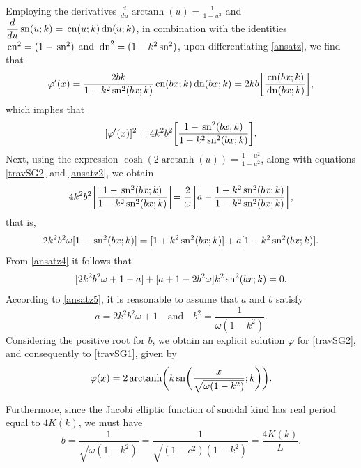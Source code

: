 \documentclass[12pt,reqno,a4paper]{amsart} %
\newcommand{\cn}{{\rm \,cn}}
\newcommand{\sn}{{\rm \,sn}}
\newcommand{\dn}{{\rm \,dn}}
\numberwithin{equation}{section}
\numberwithin{figure}{section}
\begin{document}
 Employing the derivatives $\displaystyle\frac{d}{du}\operatorname{arctanh}(u)=\frac{1}{1-u^2}$ and $\displaystyle\frac{d}{du}\sn(u;k)=\cn(u;k)\dn(u;k)$, in combination with the identities $ \cn^2=(1-\sn^2)$ and $\dn^2=(1-k^2\sn^2)$, upon differentiating \eqref{ansatz}, we find that
 \begin{equation}\label{varphilinha}
 	\varphi'(x) =\frac{2bk}{1-k^2 \sn^2 (bx ;k )} \cn (bx ;k ) \dn (bx ;k )= 2kb\biggl[ \frac{ \cn (bx ;k )}{\dn (bx ;k )}\biggl], 
 \end{equation}which implies that 
 \begin{align}
 	\label{ansatz2}
 	[	\varphi'(x) ]^2= 4k^2b^2 \biggl[\frac{1- \sn^2 (bx ;k )}{1-k^2\sn^2 (bx ;k )}\biggl].  
 \end{align}
\indent  Next, using the expression $\displaystyle\cosh(2\operatorname{arctanh}(u))=\frac{1+u^2}{1-u^2}$, along with equations \eqref{travSG2} and \eqref{ansatz2}, we obtain
 \begin{align*}
 	4k^2b^2 \biggl[\frac{1- \sn^2 (bx ;k )}{1-k^2\sn^2 (bx ;k )}\biggl]=  \frac{2}{\omega}\biggl[a-\frac{1+k^2\sn^2(bx;k)}{1-k^2\sn^2(bx;k)}\biggl],
 \end{align*}that is, 
 \begin{align}
 	\label{ansatz4}
 	2k^2b^2 \omega[ 1- \sn^2 (bx ;k )] =   [ 1+k^2\sn^2(bx;k)]+a[1-k^2\sn^2(bx;k)]. \end{align}
 From \eqref{ansatz4} it follows that
 \begin{align}
 	\label{ansatz5}
 	[	2k^2b^2 \omega+1-a]+[a+1-	2 b^2 \omega ]k^2\sn^2 (bx ;k ) =    0. \end{align}
 According to \eqref{ansatz5}, it is reasonable to assume that $a$ and $b$ satisfy
 \begin{equation*}
 	a=2k^2b^2\omega+1 \quad \text{and} \quad b^2=\frac{1}{\omega(1-k^2)}. 
 \end{equation*}
 Considering the positive root for $b$, we obtain an explicit solution $\varphi$ for \eqref{travSG2}, and consequently to \eqref{travSG1}, given by  
 \begin{equation}	 \label{travSG13}
 	\varphi(x)  =2\operatorname{arctanh}\biggl(k \sn\biggl(\frac{x}{\sqrt{\omega(1-k^2)}} ;k\biggl)\biggl).
 \end{equation}  
 
 Furthermore, since the Jacobi elliptic function of snoidal kind has real period equal to $4K(k)$, we must have
 \begin{equation}\label{speed1}
 	b=\frac{1}{\sqrt{\omega(1-k^2)}}=	\frac{1}{\sqrt{(1-c^2)(1-k^2)}}=\frac{4K(k)}{L}.
 \end{equation}
 
\end{document}
